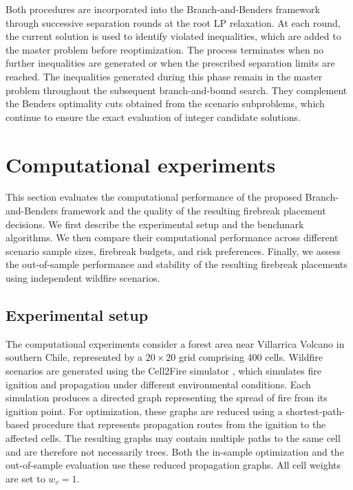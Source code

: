 \documentclass{itor}
\begin{document}
Both procedures are incorporated into the Branch-and-Benders framework through successive separation rounds at the root LP relaxation. At each round, the current solution is used to identify violated inequalities, which are added to the master problem before reoptimization. The process terminates when no further inequalities are generated or when the
prescribed separation limits are reached. The inequalities generated during this phase remain in the master problem throughout the subsequent branch-and-bound search. They complement the Benders optimality cuts obtained from the scenario subproblems, which continue to ensure the exact evaluation of integer candidate solutions.


\section{Computational experiments}\label{sec:computational}
This section evaluates the computational performance of the proposed Branch-and-Benders framework and the quality of the resulting firebreak placement decisions. We first describe the experimental setup and the benchmark algorithms. We then compare their computational performance across different scenario sample sizes, firebreak budgets, and risk preferences. Finally, we assess the out-of-sample performance and stability of the resulting firebreak placements using independent wildfire scenarios.

\subsection{Experimental setup}
\label{sec:compared}

The computational experiments consider a forest area near Villarrica
Volcano in southern Chile, represented by a $20\times20$ grid comprising
400 cells. Wildfire scenarios are generated using the Cell2Fire simulator
\citep{pais2021cell2fire}, which simulates fire ignition and propagation
under different environmental conditions. Each simulation produces a
directed graph representing the spread of fire from its ignition point.
For optimization, these graphs are reduced using a shortest-path-based
procedure that represents propagation routes from the ignition to the
affected cells. The resulting graphs may contain multiple paths to the
same cell and are therefore not necessarily trees. Both the in-sample optimization and the out-of-sample evaluation use these reduced propagation graphs. All cell weights are set to $w_v=1$.
\end{document}

